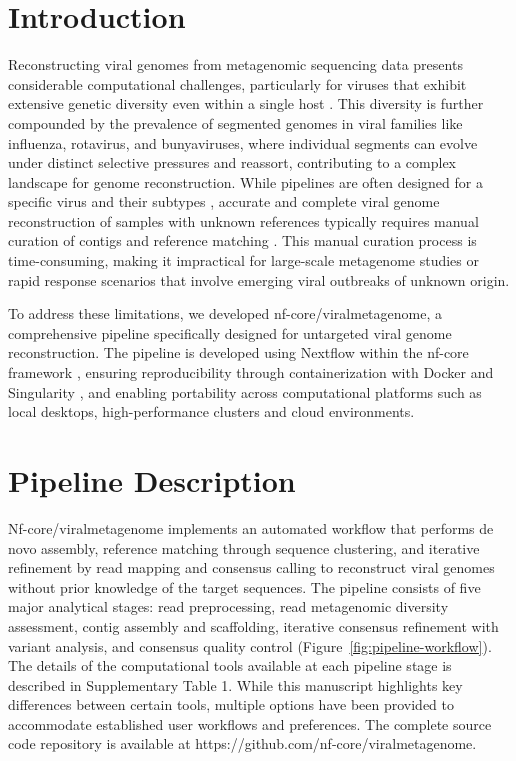 
\section{Introduction}
Reconstructing viral genomes from metagenomic sequencing data presents considerable computational challenges, particularly for viruses that exhibit extensive genetic diversity even within a single host \cite{Baaijens2017-hw,Deng2021-nl,Meleshko2021-gb}. This diversity is further compounded by the prevalence of segmented genomes in viral families like influenza, rotavirus, and bunyaviruses, where individual segments can evolve under distinct selective pressures and reassort, contributing to a complex landscape for genome reconstruction. While pipelines are often designed for a specific virus and their subtypes \cite{Shepard2016-uh}, accurate and complete viral genome reconstruction of samples with unknown references typically requires manual curation of contigs and reference matching \cite{Tomkins-Tinch2017-qi,De_Vries2021-po,Li2025-uh}. This manual curation process is time-consuming, making it impractical for large-scale metagenome studies or rapid response scenarios that involve emerging viral outbreaks of unknown origin.

To address these limitations, we developed nf-core/viralmetagenome, a comprehensive pipeline specifically designed for untargeted viral genome reconstruction. The pipeline is developed using Nextflow \cite{Di-Tommaso2017-nz} within the nf-core framework \cite{Ewels2020-kk}, ensuring reproducibility through containerization with Docker \cite{Merkel2014-hn} and Singularity \cite{Kurtzer2017-iw}, and enabling portability across computational platforms such as local desktops, high-performance clusters and cloud environments.

\section{Pipeline Description}

Nf-core/viralmetagenome implements an automated workflow that performs de novo assembly, reference matching through sequence clustering, and iterative refinement by read mapping and consensus calling to reconstruct viral genomes without prior knowledge of the target sequences. The pipeline consists of five major analytical stages: read preprocessing, read metagenomic diversity assessment, contig assembly and scaffolding, iterative consensus refinement with variant analysis, and consensus quality control (Figure~\ref{fig:pipeline-workflow}). The details of the computational tools available at each pipeline stage is described in Supplementary Table 1. While this manuscript highlights key differences between certain tools, multiple options have been provided to accommodate established user workflows and preferences. The complete source code repository is available at https://github.com/nf-core/viralmetagenome.

